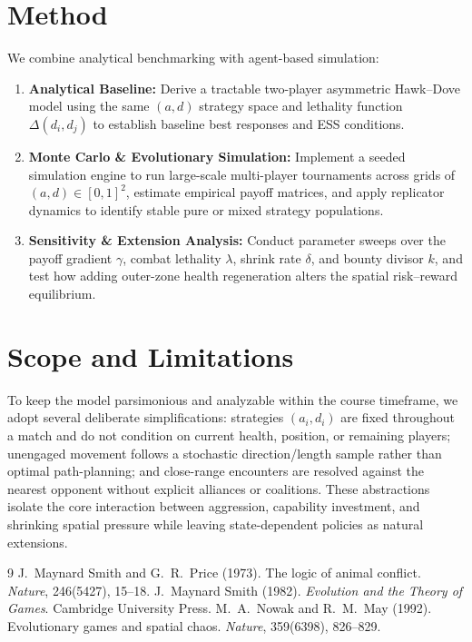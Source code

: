 \documentclass[10pt,a4paper]{article}
\begin{document}
\section{Method}
We combine analytical benchmarking with agent-based simulation:
\begin{enumerate}\itemsep2pt
  \item \textbf{Analytical Baseline:} Derive a tractable two-player asymmetric Hawk--Dove model using the same $(a, d)$ strategy space and lethality function $\Delta(d_i, d_j)$ to establish baseline best responses and ESS conditions.
  \item \textbf{Monte Carlo \& Evolutionary Simulation:} Implement a seeded simulation engine to run large-scale multi-player tournaments across grids of $(a, d) \in [0,1]^2$, estimate empirical payoff matrices, and apply replicator dynamics to identify stable pure or mixed strategy populations.
  \item \textbf{Sensitivity \& Extension Analysis:} Conduct parameter sweeps over the payoff gradient $\gamma$, combat lethality $\lambda$, shrink rate $\delta$, and bounty divisor $k$, and test how adding outer-zone health regeneration alters the spatial risk--reward equilibrium.
\end{enumerate}

\section{Scope and Limitations}
To keep the model parsimonious and analyzable within the course timeframe, we adopt several deliberate simplifications: strategies $(a_i, d_i)$ are fixed throughout a match and do not condition on current health, position, or remaining players; unengaged movement follows a stochastic direction/length sample rather than optimal path-planning; and close-range encounters are resolved against the nearest opponent without explicit alliances or coalitions. These abstractions isolate the core interaction between aggression, capability investment, and shrinking spatial pressure while leaving state-dependent policies as natural extensions.

\begin{thebibliography}{9}\itemsep1pt
\small
{} J.~Maynard Smith and G.~R.~Price (1973). The logic of animal conflict. \emph{Nature}, 246(5427), 15--18.
 J.~Maynard Smith (1982). \emph{Evolution and the Theory of Games}. Cambridge University Press.
 M.~A.~Nowak and R.~M.~May (1992). Evolutionary games and spatial chaos. \emph{Nature}, 359(6398), 826--829.
\end{thebibliography}
\end{document}
